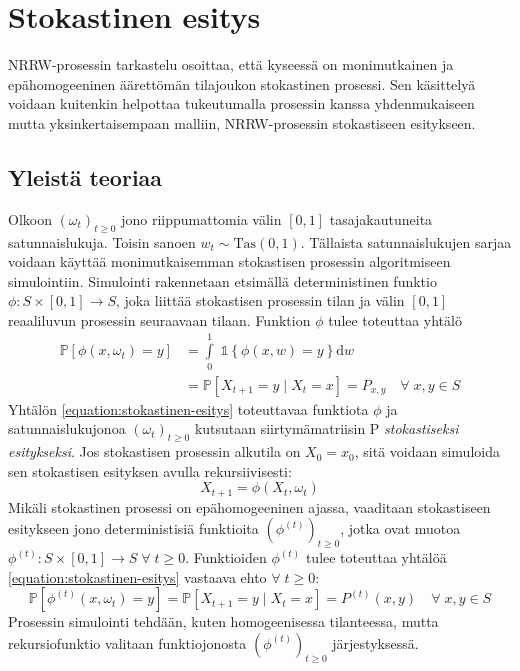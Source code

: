 \documentclass[finnish, 12pt, a4paper, sci, utf8, pdfa]{aaltothesis}
\newcommand{\indicator}{\mathopen{\mathds{1}}}
\newcommand*{\prob}{\mathbb{P}}
\begin{document}
\section{Stokastinen esitys}

NRRW-prosessin tarkastelu osoittaa, että kyseessä on monimutkainen ja epähomogeeninen äärettömän tilajoukon stokastinen prosessi. Sen käsittelyä voidaan kuitenkin helpottaa tukeutumalla
prosessin kanssa yhdenmukaiseen mutta yksinkertaisempaan malliin, NRRW-prosessin stokastiseen esitykseen.

\subsection{Yleistä teoriaa}

Olkoon \( (\omega_{t})_{t \geq 0} \) jono riippumattomia välin \( [0, 1] \) tasajakautuneita satunnaislukuja. Toisin sanoen \( w_{t} \sim \text{Tas}(0, 1) \). Tällaista satunnaislukujen sarjaa voidaan käyttää monimutkaisemman stokastisen prosessin algoritmiseen simulointiin. Simulointi rakennetaan etsimällä deterministinen funktio \( \phi : S \times [0, 1] \to S \), joka liittää stokastisen prosessin tilan ja välin \( [0, 1] \) reaaliluvun prosessin seuraavaan tilaan. Funktion \( \phi \) tulee toteuttaa yhtälö
\begin{align}
   \prob \left[ \phi(x, \omega_{t}) = y \right] &= \int\limits_0^1 \; \indicator \left\{ \phi(x, w) = y \right\} \mathrm{d}w \\
                                                &= \prob \left[ X_{t+1} = y \mid X_{t} = x \right] = P_{x,y} \quad \forall \; x, y \in S
   \label{equation:stokastinen-esitys}
\end{align}
Yhtälön \ref{equation:stokastinen-esitys} toteuttavaa funktiota \( \phi \) ja satunnaislukujonoa \( (\omega_{t})_{t \geq 0} \) kutsutaan siirtymämatriisin P \textit{stokastiseksi esitykseksi}. Jos stokastisen prosessin alkutila on \( X_{0} = x_{0} \), sitä voidaan simuloida sen stokastisen esityksen avulla rekursiivisesti:
\[
   X_{t+1} = \phi(X_{t}, \omega_{t})
\]
Mikäli stokastinen prosessi on epähomogeeninen ajassa, vaaditaan stokastiseen esitykseen jono deterministisiä funktioita \( (\phi^{(t)})_{t \geq 0} \), jotka ovat muotoa \( \phi^{(t)} : S \times [0, 1] \to S \; \forall \; t \geq 0 \). Funktioiden \( \phi^{(t)} \) tulee toteuttaa yhtälöä \ref{equation:stokastinen-esitys} vastaava ehto \( \forall \; t \geq 0 \):
\begin{equation}
   \prob \left[ \phi^{(t)}(x, \omega_{t}) = y \right] = \prob \left[ X_{t+1} = y \mid X_{t} = x \right] = P^{(t)}(x,y) \quad \forall \; x, y \in S
   \label{equation:epahom-stokastinen-esitys}
\end{equation}
Prosessin simulointi tehdään, kuten homogeenisessa tilanteessa, mutta rekursiofunktio valitaan funktiojonosta \( (\phi^{(t)})_{t \geq 0} \) järjestyksessä. \cite{Haggstrom}
\end{document}
